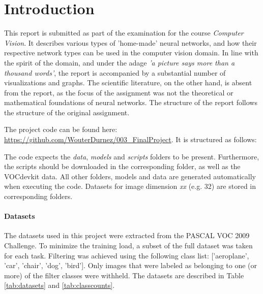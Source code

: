 
\section{Introduction}
\label{sec:intro}

This report is submitted as part of the examination for the course \textit{Computer Vision}. It describes various types of 'home-made' neural networks, and how their respective network types can be used in the computer vision domain. In line with the spirit of the domain, and under the adage \textit{'a picture says more than a thousand words'}, the report is accompanied by a substantial number of visualizations and graphs. The scientific literature, on the other hand, is absent from the report, as the focus of the assignment was not the theoretical or mathematical foundations of neural networks. The structure of the report follows the structure of the original assignment. 

\vspace{5mm} %

The project code can be found here: \textcolor{blue}{\url{https://github.com/WouterDurnez/003_FinalProject}}. It is structured as follows:

\begin{figure}[!h]
\begin{center}
\begin{minipage}{4cm}
\end{minipage}
\end{center}
\end{figure}

The code expects the \textit{data}, \textit{models} and \textit{scripts} folders to be present. Furthermore, the scripts should be downloaded in the corresponding folder, as well as the VOCdevkit data. All other folders, models and data are generated automatically when executing the code. Datasets for image dimension \textit{xx} (e.g. 32) are stored in corresponding folders.

\paragraph{Datasets} The datasets used in this project were extracted from the PASCAL VOC 2009 Challenge. To minimize the training load, a subset of the full dataset was taken for each task. Filtering was achieved using the following class list: ['aeroplane', 'car', 'chair', 'dog', 'bird']. Only images that were labeled as belonging to one (or more) of the filter classes were withheld. The datasets are described in Table \ref{tab:datasets} and \ref{tab:classcounts}.

